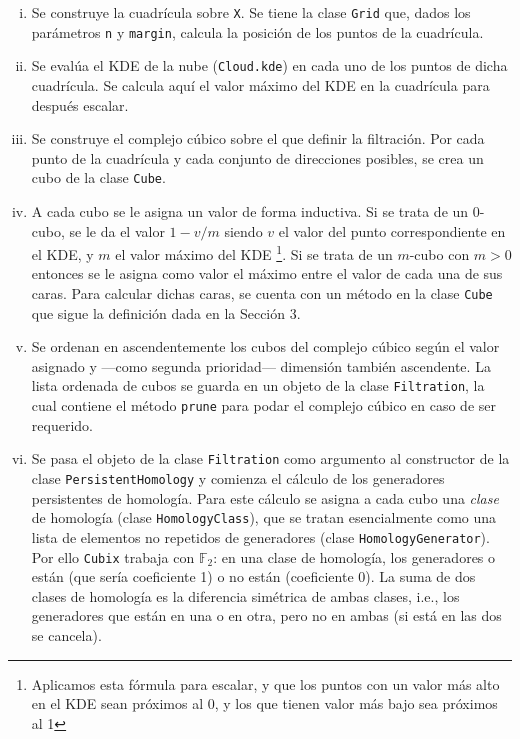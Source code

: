 \documentclass[12pt,a4paper,twoside]{article} %
\theoremstyle{plain}
\theoremstyle{definition}
\newcommand{\F}{\mathbb{F}}
\begin{document}
\begin{enumerate}[(i)]
\item Se construye la cuadrícula sobre \texttt{X}. Se tiene la clase \texttt{Grid} que, dados los parámetros \texttt{n} y \texttt{margin}, calcula la posición de los puntos de la cuadrícula.

\item Se evalúa el KDE de la nube (\texttt{Cloud.kde}) en cada uno de los puntos de dicha cuadrícula. Se calcula aquí el valor máximo del KDE en la cuadrícula para después escalar.

\item Se construye el complejo cúbico sobre el que definir la filtración. Por cada punto de la cuadrícula y cada conjunto de direcciones posibles, se crea un cubo de la clase \texttt{Cube}.

\item A cada cubo se le asigna un valor de forma inductiva. Si se trata de un $0$-cubo, se le da el valor $1-v/m$ siendo $v$ el valor del punto correspondiente en el KDE, y $m$ el valor máximo del KDE \footnote{Aplicamos esta fórmula para escalar, y que los puntos con un valor más alto en el KDE sean próximos al 0, y los que tienen valor más bajo sea próximos al 1}. Si se trata de un $m$-cubo con $m>0$ entonces se le asigna como valor el máximo entre el valor de cada una de sus caras. Para calcular dichas caras, se cuenta con un método en la clase \texttt{Cube} que sigue la definición dada en la Sección 3.

\item Se ordenan en ascendentemente los cubos del complejo cúbico según el valor asignado y ---como segunda prioridad--- dimensión también ascendente. La lista ordenada de cubos se guarda en un objeto de la clase \texttt{Filtration}, la cual contiene el método \texttt{prune} para podar el complejo cúbico en caso de ser requerido.

\item Se pasa el objeto de la clase \texttt{Filtration} como argumento al constructor de la clase \texttt{PersistentHomology} y comienza el cálculo de los generadores persistentes de homología. Para este cálculo se asigna a cada cubo una \emph{clase} de homología (clase \texttt{HomologyClass}), que se tratan esencialmente como una lista de elementos no repetidos de generadores (clase \texttt{HomologyGenerator}). Por ello \texttt{Cubix} trabaja con $\F_2$: en una clase de homología, los generadores o están (que sería coeficiente 1) o no están (coeficiente 0). La suma de dos clases de homología es la diferencia simétrica de ambas clases, i.e., los generadores que están en una o en otra, pero no en ambas (si está en las dos se cancela).


\end{enumerate}
\end{document}
